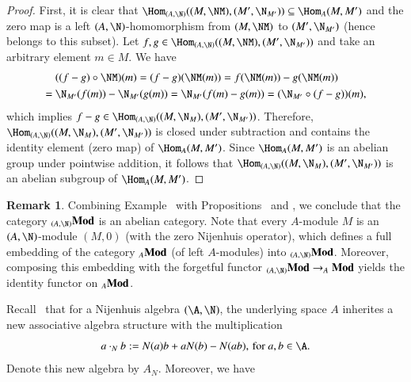 \documentclass[12pt]{amsart}
\theoremstyle{definition}
\newtheorem{remark}[theorem]{Remark}
\begin{document}
\begin{proof}
 First, it is clear that  $\Hom_{(A,\N)}((M,\NM),(M',\N_{M'})) \subseteq \Hom_A(M,M')$ and the zero map is a left $(A,\N)$-homomorphism from $(M,\NM)$ to $(M',\N_{M'})$ (hence belongs to this subset). Let $f,g \in \Hom_{(A,\N)}((M,\NM),(M',\N_{M'}))$  and take an arbitrary element  $m \in M$. We have
\begin{align*}
&\ ((f-g) \circ \NM)(m)=(f-g)(\NM(m))=f(\NM(m))-g(\NM(m))\\
=&\ \N_{M'}(f(m))-\N_{M'}(g(m))=\N_{M'}(f(m)-g(m))=(\N_{M'} \circ (f-g))(m),
\end{align*}
which implies $f - g \in \Hom_{(A,\N)}((M,\N_M), (M',\N_{M'}))$. Therefore, $\Hom_{(A,\N)}((M,\N_M), (M',\N_{M'}))$ is closed under subtraction and contains the identity element (zero map) of $\Hom_A(M,M')$. Since $\Hom_A(M,M')$ is an abelian group under pointwise addition, it follows that $\Hom_{(A,\N)}((M,\N_M), (M',\N_{M'}))$ is an abelian subgroup of $\Hom_A(M,M')$. 
\end{proof} 

\begin{remark}
Combining Example~ with Propositions~ and , we conclude that the category $_{(A,\N)}{\bf Mod}$ is an abelian category. Note that every $A$-module $M$ is an $(A,\N)$-module $(M,0)$ (with the zero Nijenhuis operator), which defines a full embedding of the category $_A {\bf Mod}$ (of left $A$-modules) into $_{(A,\N)}{\bf Mod}$. Moreover, composing this embedding with the forgetful functor $_{(A,\N)}{\bf Mod} \to  _A {\bf Mod}$ yields the identity functor on $_A {\bf Mod}$.
\end{remark} 

Recall~ that for a Nijenhuis algebra $(\A,\N)$, the underlying space $A$ inherites a new associative algebra structure with the multiplication 
\[
a \cdot_N b:=N(a)b+aN(b)-N(ab), \, \text{for $a,b \in \A$.}
\]
Denote this new algebra by $A_N$. Moreover, we have 
\end{document}

